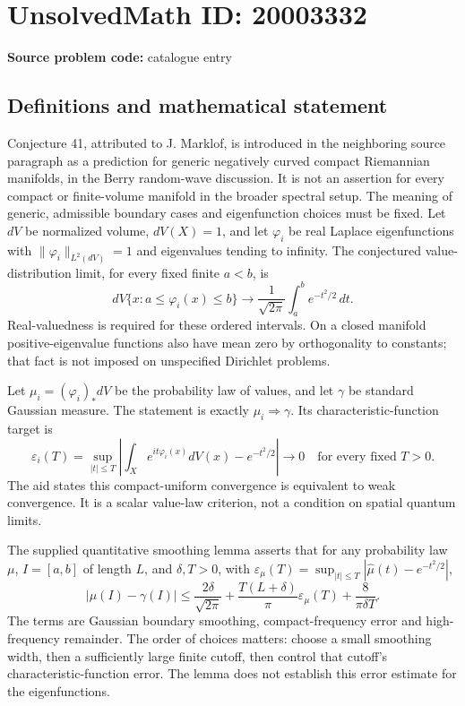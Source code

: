 \documentclass[11pt]{article}
\newcommand{\eps}{\varepsilon}
\begin{document}
\section*{UnsolvedMath ID: 20003332}
\textbf{Source problem code:} catalogue entry
\subsection{Definitions and mathematical statement}
Conjecture 41, attributed to J. Marklof, is introduced in the neighboring source paragraph as a prediction for generic negatively curved compact Riemannian manifolds, in the Berry random-wave discussion. It is not an assertion for every compact or finite-volume manifold in the broader spectral setup. The meaning of generic, admissible boundary cases and eigenfunction choices must be fixed. Let $dV$ be normalized volume, $dV(X)=1$, and let $\varphi_i$ be real Laplace eigenfunctions with $\|\varphi_i\|_{L^2(dV)}=1$ and eigenvalues tending to infinity. The conjectured value-distribution limit, for every fixed finite $a<b$, is
\[
 dV\{x:a\leq\varphi_i(x)\leq b\}
 \longrightarrow\frac1{\sqrt{2\pi}}\int_a^b e^{-t^2/2}\,dt.
\]
Real-valuedness is required for these ordered intervals. On a closed manifold positive-eigenvalue functions also have mean zero by orthogonality to constants; that fact is not imposed on unspecified Dirichlet problems.

Let $\mu_i=(\varphi_i)_*dV$ be the probability law of values, and let $\gamma$ be standard Gaussian measure. The statement is exactly $\mu_i\Rightarrow\gamma$. Its characteristic-function target is
\[
 \eps_i(T)=\sup_{|t|\leq T}
 \left|\int_X e^{it\varphi_i(x)}dV(x)-e^{-t^2/2}\right|
                  \longrightarrow0\quad\text{for every fixed }T>0.
\]
The aid states this compact-uniform convergence is equivalent to weak convergence. It is a scalar value-law criterion, not a condition on spatial quantum limits.

The supplied quantitative smoothing lemma asserts that for any probability law $\mu$, $I=[a,b]$ of length $L$, and $\delta,T>0$, with $\eps_\mu(T)=\sup_{|t|\leq T}|\widehat\mu(t)-e^{-t^2/2}|$,
\[
 |\mu(I)-\gamma(I)|\leq
 \frac{2\delta}{\sqrt{2\pi}}
 +\frac{T(L+\delta)}\pi\eps_\mu(T)
 +\frac8{\pi\delta T}.
\]
The terms are Gaussian boundary smoothing, compact-frequency error and high-frequency remainder. The order of choices matters: choose a small smoothing width, then a sufficiently large finite cutoff, then control that cutoff's characteristic-function error. The lemma does not establish this error estimate for the eigenfunctions.
\end{document}

